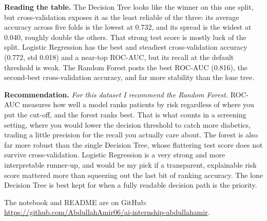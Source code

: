 \documentclass[11pt,a4paper]{article}
\begin{document}
\textbf{Reading the table.} The Decision Tree looks like the winner on this one
split, but cross-validation exposes it as the least reliable of the three: its
average accuracy across five folds is the lowest at 0.732, and its spread is the
widest at 0.040, roughly double the others. That strong test score is mostly luck
of the split. Logistic Regression has the best and steadiest cross-validation
accuracy (0.772, std 0.018) and a near-top ROC-AUC, but its recall at the default
threshold is weak. The Random Forest posts the best ROC-AUC (0.816), the
second-best cross-validation accuracy, and far more stability than the lone tree.

\textbf{Recommendation.} \emph{For this dataset I recommend the Random Forest.}
ROC-AUC measures how well a model ranks patients by risk regardless of where you
put the cut-off, and the forest ranks best. That is what counts in a screening
setting, where you would lower the decision threshold to catch more diabetics,
trading a little precision for the recall you actually care about. The forest is
also far more robust than the single Decision Tree, whose flattering test score
does not survive cross-validation. Logistic Regression is a very strong and more
interpretable runner-up, and would be my pick if a transparent, explainable risk
score mattered more than squeezing out the last bit of ranking accuracy. The lone
Decision Tree is best kept for when a fully readable decision path is the priority.

\vspace{0.4cm}
The notebook and README are on GitHub:
\url{https://github.com/AbdullahAmir06/ai-internship-abdullahamir}.
\end{document}
